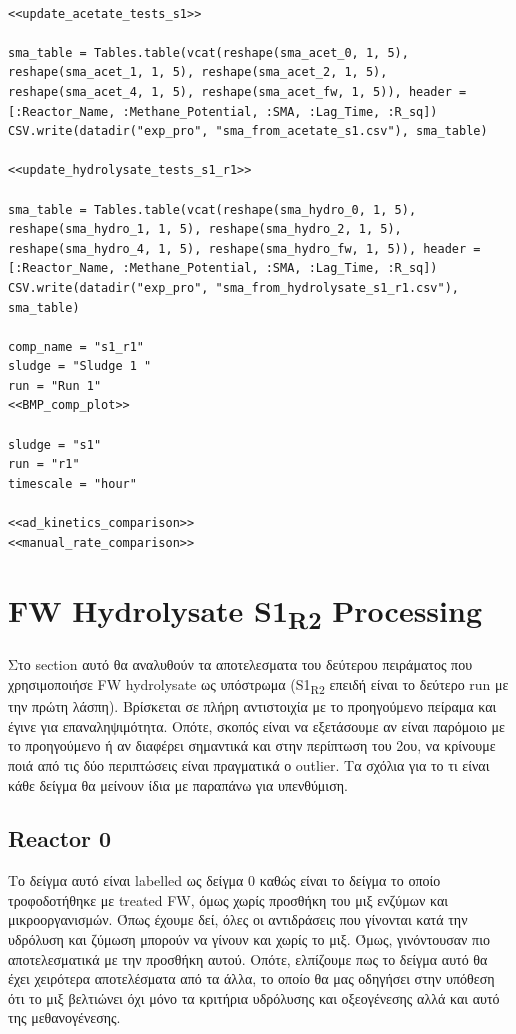 \documentclass[11pt]{article}
\begin{document}
\begin{verbatim}

<<update_acetate_tests_s1>>

sma_table = Tables.table(vcat(reshape(sma_acet_0, 1, 5), reshape(sma_acet_1, 1, 5), reshape(sma_acet_2, 1, 5), reshape(sma_acet_4, 1, 5), reshape(sma_acet_fw, 1, 5)), header = [:Reactor_Name, :Methane_Potential, :SMA, :Lag_Time, :R_sq])
CSV.write(datadir("exp_pro", "sma_from_acetate_s1.csv"), sma_table)

<<update_hydrolysate_tests_s1_r1>>

sma_table = Tables.table(vcat(reshape(sma_hydro_0, 1, 5), reshape(sma_hydro_1, 1, 5), reshape(sma_hydro_2, 1, 5), reshape(sma_hydro_4, 1, 5), reshape(sma_hydro_fw, 1, 5)), header = [:Reactor_Name, :Methane_Potential, :SMA, :Lag_Time, :R_sq])
CSV.write(datadir("exp_pro", "sma_from_hydrolysate_s1_r1.csv"), sma_table)

comp_name = "s1_r1"
sludge = "Sludge 1 "
run = "Run 1"
<<BMP_comp_plot>>

sludge = "s1"
run = "r1"
timescale = "hour"

<<ad_kinetics_comparison>>
<<manual_rate_comparison>>
\end{verbatim}

\section{FW Hydrolysate S1\textsubscript{R2} Processing}
\label{sec:orgfa2cf8e}
Στο section αυτό θα αναλυθούν τα αποτελεσματα του δεύτερου πειράματος που χρησιμοποιήσε FW hydrolysate ως υπόστρωμα (S1\textsubscript{R2} επειδή είναι το δεύτερο run με την πρώτη λάσπη). Βρίσκεται σε πλήρη αντιστοιχία με το προηγούμενο πείραμα και έγινε για επαναληψιμότητα. Οπότε, σκοπός είναι να εξετάσουμε αν είναι παρόμοιο με το προηγούμενο ή αν διαφέρει σημαντικά και στην περίπτωση του 2ου, να κρίνουμε ποιά από τις δύο περιπτώσεις είναι πραγματικά ο outlier. Τα σχόλια για το τι είναι κάθε δείγμα θα μείνουν ίδια με παραπάνω για υπενθύμιση.

\subsection{Reactor 0}
\label{sec:org93e1d3e}
Το δείγμα αυτό είναι labelled ως δείγμα 0 καθώς είναι το δείγμα το οποίο τροφοδοτήθηκε με treated FW, όμως χωρίς προσθήκη του μιξ ενζύμων και μικροοργανισμών. Όπως έχουμε δεί, όλες οι αντιδράσεις που γίνονται κατά την υδρόλυση και ζύμωση μπορούν να γίνουν και χωρίς το μιξ. Όμως, γινόντουσαν πιο αποτελεσματικά με την προσθήκη αυτού. Οπότε, ελπίζουμε πως το δείγμα αυτό θα έχει χειρότερα αποτελέσματα από τα άλλα, το οποίο θα μας οδηγήσει στην υπόθεση ότι το μιξ βελτιώνει όχι μόνο τα κριτήρια υδρόλυσης και οξεογένεσης αλλά και αυτό της μεθανογένεσης.
\end{document}
